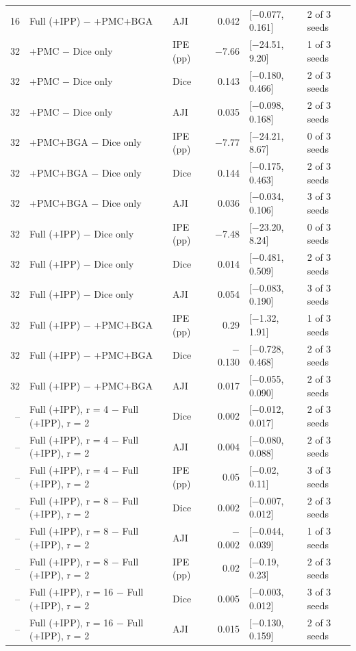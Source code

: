 \documentclass[10pt]{article}
\begin{document}
\begin{landscape}
{\begin{longtable}{r l l r l l}
16 & Full (+IPP) $-$ +PMC+BGA & AJI & 0.042 & [$-$0.077, 0.161] & 2 of 3 seeds \\
32 & +PMC $-$ Dice only & IPE (pp) & $-$7.66 & [$-$24.51, 9.20] & 1 of 3 seeds \\
32 & +PMC $-$ Dice only & Dice & 0.143 & [$-$0.180, 0.466] & 2 of 3 seeds \\
32 & +PMC $-$ Dice only & AJI & 0.035 & [$-$0.098, 0.168] & 2 of 3 seeds \\
32 & +PMC+BGA $-$ Dice only & IPE (pp) & $-$7.77 & [$-$24.21, 8.67] & 0 of 3 seeds \\
32 & +PMC+BGA $-$ Dice only & Dice & 0.144 & [$-$0.175, 0.463] & 2 of 3 seeds \\
32 & +PMC+BGA $-$ Dice only & AJI & 0.036 & [$-$0.034, 0.106] & 3 of 3 seeds \\
32 & Full (+IPP) $-$ Dice only & IPE (pp) & $-$7.48 & [$-$23.20, 8.24] & 0 of 3 seeds \\
32 & Full (+IPP) $-$ Dice only & Dice & 0.014 & [$-$0.481, 0.509] & 2 of 3 seeds \\
32 & Full (+IPP) $-$ Dice only & AJI & 0.054 & [$-$0.083, 0.190] & 3 of 3 seeds \\
32 & Full (+IPP) $-$ +PMC+BGA & IPE (pp) & 0.29 & [$-$1.32, 1.91] & 1 of 3 seeds \\
32 & Full (+IPP) $-$ +PMC+BGA & Dice & $-$0.130 & [$-$0.728, 0.468] & 2 of 3 seeds \\
32 & Full (+IPP) $-$ +PMC+BGA & AJI & 0.017 & [$-$0.055, 0.090] & 2 of 3 seeds \\
-- & Full (+IPP), r = 4 $-$ Full (+IPP), r = 2 & Dice & 0.002 & [$-$0.012, 0.017] & 2 of 3 seeds \\
-- & Full (+IPP), r = 4 $-$ Full (+IPP), r = 2 & AJI & 0.004 & [$-$0.080, 0.088] & 2 of 3 seeds \\
-- & Full (+IPP), r = 4 $-$ Full (+IPP), r = 2 & IPE (pp) & 0.05 & [$-$0.02, 0.11] & 3 of 3 seeds \\
-- & Full (+IPP), r = 8 $-$ Full (+IPP), r = 2 & Dice & 0.002 & [$-$0.007, 0.012] & 2 of 3 seeds \\
-- & Full (+IPP), r = 8 $-$ Full (+IPP), r = 2 & AJI & $-$0.002 & [$-$0.044, 0.039] & 1 of 3 seeds \\
-- & Full (+IPP), r = 8 $-$ Full (+IPP), r = 2 & IPE (pp) & 0.02 & [$-$0.19, 0.23] & 2 of 3 seeds \\
-- & Full (+IPP), r = 16 $-$ Full (+IPP), r = 2 & Dice & 0.005 & [$-$0.003, 0.012] & 3 of 3 seeds \\
-- & Full (+IPP), r = 16 $-$ Full (+IPP), r = 2 & AJI & 0.015 & [$-$0.130, 0.159] & 2 of 3 seeds \\

\end{longtable}}
\end{landscape}
\end{document}
